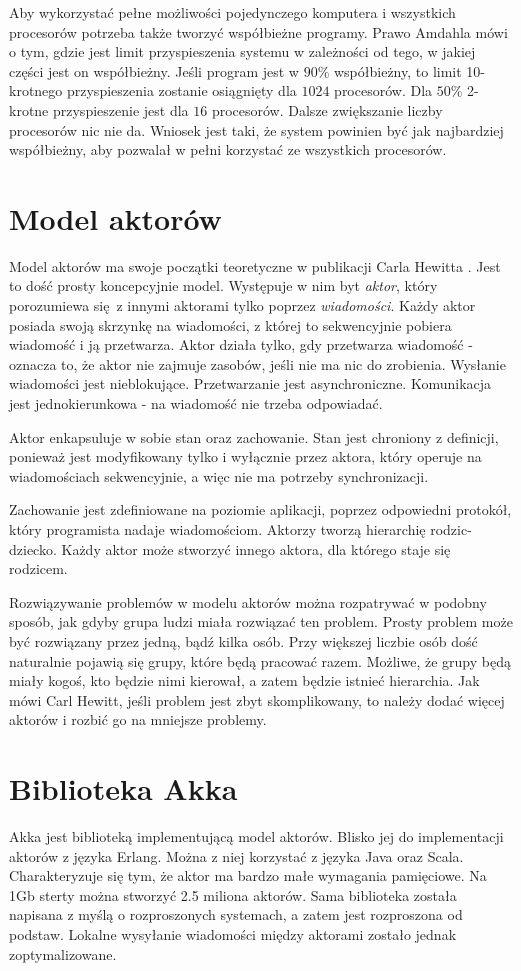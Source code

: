 \documentclass[oneside, 12pt, a4paper]{article}
\begin{document}
\begin{multicols}{2}
Aby wykorzystać pełne możliwości pojedynczego komputera i wszystkich procesorów potrzeba także tworzyć współbieżne programy. Prawo Amdahla mówi o tym, gdzie jest limit przyspieszenia systemu w zależności od tego, w jakiej części jest on współbieżny. Jeśli program jest w $90\%$ współbieżny, to limit 10-krotnego przyspieszenia zostanie osiągnięty dla $1024$ procesorów. Dla $50\%$ 2-krotne przyspieszenie jest dla $16$ procesorów. Dalsze zwiększanie liczby procesorów nic nie da. Wniosek jest taki, że system powinien być jak najbardziej współbieżny, aby pozwalał w pełni korzystać ze wszystkich procesorów.

\section{Model aktorów}
Model aktorów ma swoje początki teoretyczne w publikacji Carla Hewitta \cite{Hewitt:1973vp}. Jest to dość prosty koncepcyjnie model. Występuje w nim byt \emph{aktor}, który porozumiewa się z innymi aktorami tylko poprzez \emph{wiadomości}. Każdy aktor posiada swoją skrzynkę na wiadomości, z której to sekwencyjnie pobiera wiadomość i ją przetwarza. Aktor działa tylko, gdy przetwarza wiadomość - oznacza to, że aktor nie zajmuje zasobów, jeśli nie ma nic do zrobienia. Wysłanie wiadomości jest nieblokujące. Przetwarzanie jest asynchroniczne. Komunikacja jest jednokierunkowa - na wiadomość nie trzeba odpowiadać.

Aktor enkapsuluje w sobie stan oraz zachowanie. Stan jest chroniony z definicji, ponieważ jest modyfikowany tylko i wyłącznie przez aktora, który operuje na wiadomościach sekwencyjnie, a więc nie ma potrzeby synchronizacji.

Zachowanie jest zdefiniowane na poziomie aplikacji, poprzez odpowiedni protokół, który programista nadaje wiadomościom. Aktorzy tworzą hierarchię rodzic-dziecko. Każdy aktor może stworzyć innego aktora, dla którego staje się rodzicem. 

Rozwiązywanie problemów w modelu aktorów można rozpatrywać w podobny sposób, jak gdyby grupa ludzi miała rozwiązać ten problem. Prosty problem może być rozwiązany przez jedną, bądź kilka osób. Przy większej liczbie osób dość naturalnie pojawią się grupy, które będą pracować razem. Możliwe, że grupy będą miały kogoś, kto będzie nimi kierował, a zatem będzie istnieć hierarchia. Jak mówi Carl Hewitt, jeśli problem jest zbyt skomplikowany, to należy dodać więcej aktorów i rozbić go na mniejsze problemy.

\section{Biblioteka Akka}
Akka jest biblioteką implementującą model aktorów. Blisko jej do implementacji aktorów z języka Erlang. Można z niej korzystać z języka Java oraz Scala. Charakteryzuje się tym, że aktor ma bardzo małe wymagania pamięciowe. Na 1Gb sterty można stworzyć 2.5 miliona aktorów. Sama biblioteka została napisana z myślą o rozproszonych systemach, a zatem jest rozproszona od podstaw. Lokalne wysyłanie wiadomości między aktorami zostało jednak zoptymalizowane. 


\end{multicols}
\end{document}
